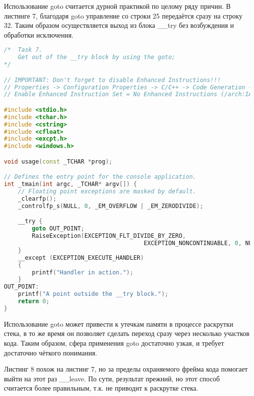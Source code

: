 \documentclass[a4paper,12pt]{article} %
\begin{document}
Использование goto считается дурной практикой по целому ряду причин. В листинге 7, благодаря goto управление со строки 25 передаётся сразу на строку 32. Таким образом осуществляется выход из блока \_\_try без возбуждения и обработки исключения.

\begin{lstlisting}[language=C++, caption={Выход из блока охраняемого кода при помощи goto}]
/*  Task 7.
	Get out of the __try block by using the goto;
*/

// IMPORTANT: Don't forget to disable Enhanced Instructions!!!
// Properties -> Configuration Properties -> C/C++ -> Code Generation ->
// Enable Enhanced Instruction Set = No Enhanced Instructions (/arch:IA32)

#include <stdio.h>
#include <tchar.h>
#include <cstring>
#include <cfloat>
#include <excpt.h>
#include <windows.h>

void usage(const _TCHAR *prog);

// Defines the entry point for the console application.
int _tmain(int argc, _TCHAR* argv[]) {
	// Floating point exceptions are masked by default.
	_clearfp();
	_controlfp_s(NULL, 0, _EM_OVERFLOW | _EM_ZERODIVIDE);

	__try {
		goto OUT_POINT;
		RaiseException(EXCEPTION_FLT_DIVIDE_BY_ZERO,
										EXCEPTION_NONCONTINUABLE, 0, NULL);
	}
	__except (EXCEPTION_EXECUTE_HANDLER)
	{
		printf("Handler in action.");
	}
OUT_POINT:
	printf("A point outside the __try block.");
	return 0;
}
\end{lstlisting}

Использование goto может привести к утечкам памяти в процессе раскрутки стека, в то же время он позволяет сделать переход сразу через несколько участков кода. Таким образом, сфера применения goto достаточно узкая, и требует достаточно чёткого понимания.
\newpage

Листинг 8 похож на листинг 7, но за пределы охраняемого фрейма кода помогает выйти на этот раз \_\_leave. По сути, результат прежний, но этот способ считается более правильным, т.к. не приводит к раскрутке стека.
\end{document}
